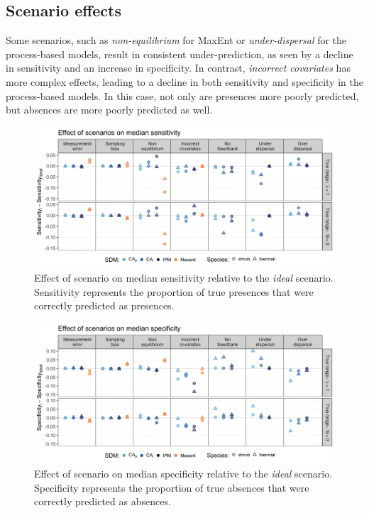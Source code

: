 \documentclass[]{article}
\begin{document}
\clearpage
\subsection{Scenario effects}

Some scenarios, such as \emph{non-equilibrium} for MaxEnt or
\emph{under-dispersal} for the process-based models, result in
consistent under-prediction, as seen by a decline in sensitivity and an
increase in specificity. In contrast, \emph{incorrect covariates} has
more complex effects, leading to a decline in both sensitivity and
specificity in the process-based models. In this case, not only are
presences more poorly predicted, but absences are more poorly predicted
as well.

\clearpage
\begin{figure}
    \centering\includegraphics[width=.9\linewidth]{../../figs/Supp_SensvIdeal.jpg}
    \caption{\label{fig:SensitivityvIdeal} Effect of scenario on median sensitivity relative to the \emph{ideal} scenario. Sensitivity represents the proportion of true presences that were correctly predicted as presences.}
\end{figure}

\begin{figure}
    \centering\includegraphics[width=.9\linewidth]{../../figs/Supp_SpecvIdeal.jpg}
    \caption{\label{fig:SpecificityvIdeal} Effect of scenario on median specificity relative to the \emph{ideal} scenario. Specificity represents the proportion of true absences that were correctly predicted as absences.}
\end{figure}
\end{document}
